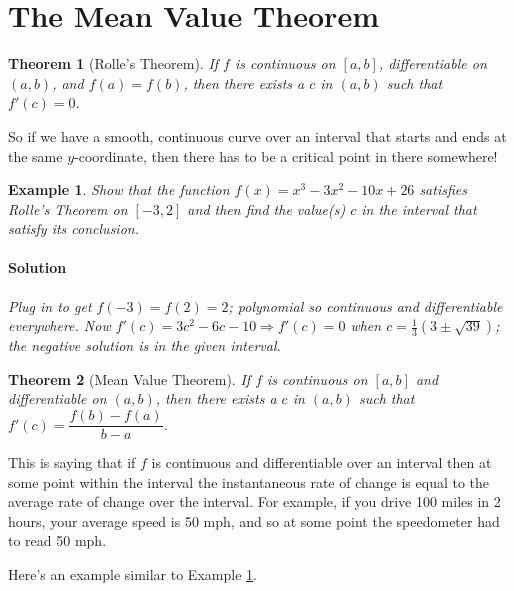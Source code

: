 \documentclass[letterpaper, 11pt, openany]{book}
\theoremstyle{mytheoremstyle}
\newtheorem{theorem}{Theorem}[section]
\theoremstyle{myexamplestyle}
\newtheorem{example}{Example}[section]
\newenvironment{solution}{\paragraph{\sffamily \smaller \fontseries{b}\selectfont Solution}}{\hfill\faSquare}
\begin{document}
\section{The Mean Value Theorem}

\begin{theorem}[Rolle's Theorem]\label{mvt-rolles}
    If \(f\) is continuous on \([a,b]\), differentiable on \((a,b)\), and \(f(a) = f(b)\), then there exists a \(c\) in \((a,b)\) such that \(f'(c) = 0\).
\end{theorem}

So if we have a smooth, continuous curve over an interval that starts and ends at the same \(y\)-coordinate, then there has to be a critical point in there somewhere!

\begin{example}\label{e:rolles-thm}
    Show that the function \(f(x) = x^3-3 x^2-10 x+26\) satisfies Rolle's Theorem on \([-3,2]\) and then find the value(s) \(c\) in the interval that satisfy its conclusion.
    \begin{solution}
        Plug in to get \(f(-3) = f(2) = 2\); polynomial so continuous and differentiable everywhere. Now \(f'(c) = 3c^2 - 6c - 10 \Rightarrow f'(c) = 0\) when \(c = \frac{1}{3} \left(3 \pm \sqrt{39}\right)\); the negative solution is in the given interval.
    \end{solution}
\end{example}

\begin{theorem}[Mean Value Theorem]\label{mvt-mvt}
    If \(f\) is continuous on \([a,b]\) and differentiable on \((a,b)\), then there exists a \(c\) in \((a,b)\) such that \(f'(c) = \dfrac{f(b) - f(a)}{b-a}\).
\end{theorem}

This is saying that if \(f\) is continuous and differentiable over an interval then at some point within the interval the instantaneous rate of change is equal to the average rate of change over the interval. For example, if you drive 100 miles in 2 hours, your average speed is 50 mph, and so at some point the speedometer had to read 50 mph.

Here's an example similar to Example \ref{e:rolles-thm}.
\end{document}
